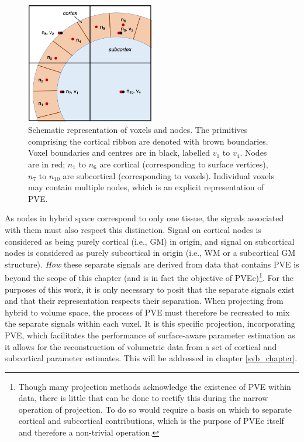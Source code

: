 \documentclass[12pt]{report}
\begin{document}
\begin{figure}
\centering
\includegraphics[width=0.5\textwidth]{voxel_node.png}
\caption{Schematic representation of voxels and nodes. The primitives comprising the cortical ribbon are denoted with brown boundaries. Voxel boundaries and centres are in black, labelled $v_1$ to $v_4$. Nodes are in red; $n_1$ to $n_6$ are cortical (corresponding to surface vertices), $n_7$ to $n_{10}$ are subcortical (corresponding to voxels). Individual voxels may contain multiple nodes, which is an explicit representation of PVE.}
\label{voxel_node} 
\end{figure}

As nodes in hybrid space correspond to only one tissue, the signals associated with them must also respect this distinction. Signal on cortical nodes is considered as being purely cortical (i.e., GM) in origin, and signal on subcortical nodes is considered as purely subcortical in origin (i.e., WM or a subcortical GM structure). \textit{How} these separate signals are derived from data that contains PVE is beyond the scope of this chapter (and is in fact the objective of PVEc)\footnote{Though many projection methods acknowledge the existence of PVE within data, there is little that can be done to rectify this during the narrow operation of projection. To do so would require a basis on which to separate cortical and subcortical contributions, which is the purpose of PVEc itself and therefore a non-trivial operation.}. For the purposes of this work, it is only necessary to posit that the separate signals exist and that their representation respects their separation. When projecting from hybrid to volume space, the process of PVE must therefore be recreated to mix the separate signals within each voxel. It is this specific projection, incorporating PVE, which facilitates the performance of surface-aware parameter estimation as it allows for the reconstruction of volumetric data from a set of cortical and subcortical parameter estimates. This will be addressed in chapter \ref{svb_chapter}. 
\end{document}
